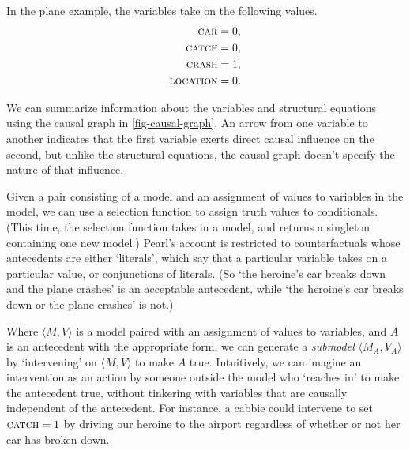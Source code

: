 In the plane example, the variables take on the following values.
$$
\begin{aligned}
  \text{\textsc{car}} &= 0,\\
  \text{\textsc{catch}} &= 0,\\
  \text{\textsc{crash}} &= 1,\\
  \text{\textsc{location}} &= 0.
\end{aligned}
$$

We can summarize information about the variables and structural equations using the causal graph in \autoref{fig-causal-graph}. An arrow from one variable to another indicates that the first variable exerts direct causal influence on the second, but unlike the structural equations, the causal graph doesn't specify the nature of that influence.

Given a pair consisting of a model and an assignment of values to variables in the model, we can use a selection function to assign truth values to conditionals.  (This time, the selection function takes in a model, and returns a singleton containing one new model.)  Pearl's account is restricted to counterfactuals whose antecedents are either `literals', which say that a particular variable takes on a particular value, or conjunctions of literals.  (So `the heroine's car breaks down and the plane crashes' is an acceptable antecedent, while `the heroine's car breaks down or the plane crashes' is not.)

Where $\langle M, V\rangle$ is a model paired with an assignment of values to variables, and $A$ is an antecedent with the appropriate form, we can generate a \emph{submodel} $\langle M_A, V_A\rangle$ by `intervening' on $\langle M, V\rangle$ to make $A$ true.  Intuitively, we can imagine an intervention as an action by someone outside the model who `reaches in' to make the antecedent true, without tinkering with variables that are causally independent of the antecedent.  For instance, a cabbie could intervene to set $\text{\textsc{catch}} = 1$ by driving our heroine to the airport regardless of whether or not her car has broken down.

